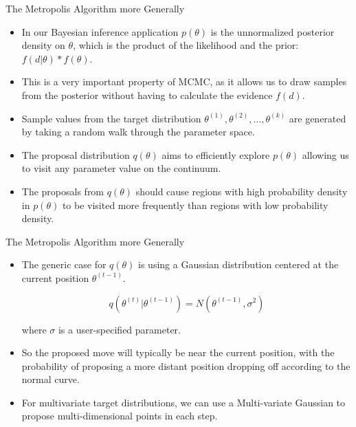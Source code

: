 \documentclass[handout]{beamer}
\begin{document}
\begin{frame}{The Metropolis Algorithm more Generally}
\scriptsize{

\begin{itemize}

\item In our Bayesian inference application $p(\theta)$ is the unnormalized posterior density on  $\theta$, which is the product of the likelihood and the prior: $f(d|\theta)*f(\theta)$.

\item This is a very important property of MCMC, as it allows us to draw samples from the posterior without having to calculate the evidence $f(d)$.

\item Sample values from the target distribution $\theta^{(1)},\theta^{(2)},\dots,\theta^{(k)}$ are generated by taking a random walk through the parameter space.

\item The proposal distribution $q(\theta)$ aims to efficiently explore $p(\theta)$ allowing us to visit any parameter value on the continuum.


\item The proposals from $q(\theta)$ should cause regions with high probability density in $p(\theta)$ to be visited more frequently than regions with low probability density.

\end{itemize}


} 
\end{frame}


\begin{frame}{The Metropolis Algorithm more Generally}
\scriptsize{

\begin{itemize}





\item The generic case for $q(\theta)$ is using a Gaussian distribution centered at the current position $\theta^{(t-1)}$.

\begin{displaymath}
 q(\theta^{(t)}|\theta^{(t-1)})=N(\theta^{(t-1)},\sigma^2)
\end{displaymath}

where $\sigma$ is a user-specified parameter.

\item So the proposed move will typically be near the current position, with the probability of proposing a more distant position dropping off according to the normal curve.

\item For multivariate target distributions, we can use a Multi-variate Gaussian to propose multi-dimensional points in each step.


\end{itemize}



}
\end{frame}
\end{document}
